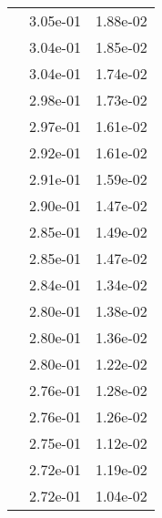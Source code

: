 \begin{table}
\begin{tabular}{c|cc|}
\multicolumn{1}{|c|}{} & \multicolumn{1}{|c|}{  3.05e-01} & \multicolumn{1}{|c|}{  1.88e-02} \\ 
\multicolumn{1}{|c|}{} & \multicolumn{1}{|c|}{  3.04e-01} & \multicolumn{1}{|c|}{  1.85e-02} \\ 
\multicolumn{1}{|c|}{} & \multicolumn{1}{|c|}{  3.04e-01} & \multicolumn{1}{|c|}{  1.74e-02} \\ 
\multicolumn{1}{|c|}{} & \multicolumn{1}{|c|}{  2.98e-01} & \multicolumn{1}{|c|}{  1.73e-02} \\ 
\multicolumn{1}{|c|}{} & \multicolumn{1}{|c|}{  2.97e-01} & \multicolumn{1}{|c|}{  1.61e-02} \\ 
\multicolumn{1}{|c|}{} & \multicolumn{1}{|c|}{  2.92e-01} & \multicolumn{1}{|c|}{  1.61e-02} \\ 
\multicolumn{1}{|c|}{} & \multicolumn{1}{|c|}{  2.91e-01} & \multicolumn{1}{|c|}{  1.59e-02} \\ 
\multicolumn{1}{|c|}{} & \multicolumn{1}{|c|}{  2.90e-01} & \multicolumn{1}{|c|}{  1.47e-02} \\ 
\multicolumn{1}{|c|}{} & \multicolumn{1}{|c|}{  2.85e-01} & \multicolumn{1}{|c|}{  1.49e-02} \\ 
\multicolumn{1}{|c|}{} & \multicolumn{1}{|c|}{  2.85e-01} & \multicolumn{1}{|c|}{  1.47e-02} \\ 
\multicolumn{1}{|c|}{} & \multicolumn{1}{|c|}{  2.84e-01} & \multicolumn{1}{|c|}{  1.34e-02} \\ 
\multicolumn{1}{|c|}{} & \multicolumn{1}{|c|}{  2.80e-01} & \multicolumn{1}{|c|}{  1.38e-02} \\ 
\multicolumn{1}{|c|}{} & \multicolumn{1}{|c|}{  2.80e-01} & \multicolumn{1}{|c|}{  1.36e-02} \\ 
\multicolumn{1}{|c|}{} & \multicolumn{1}{|c|}{  2.80e-01} & \multicolumn{1}{|c|}{  1.22e-02} \\ 
\multicolumn{1}{|c|}{} & \multicolumn{1}{|c|}{  2.76e-01} & \multicolumn{1}{|c|}{  1.28e-02} \\ 
\multicolumn{1}{|c|}{} & \multicolumn{1}{|c|}{  2.76e-01} & \multicolumn{1}{|c|}{  1.26e-02} \\ 
\multicolumn{1}{|c|}{} & \multicolumn{1}{|c|}{  2.75e-01} & \multicolumn{1}{|c|}{  1.12e-02} \\ 
\multicolumn{1}{|c|}{} & \multicolumn{1}{|c|}{  2.72e-01} & \multicolumn{1}{|c|}{  1.19e-02} \\ 
\multicolumn{1}{|c|}{} & \multicolumn{1}{|c|}{  2.72e-01} & \multicolumn{1}{|c|}{  1.04e-02} \\ 

\end{tabular}
\end{table}
